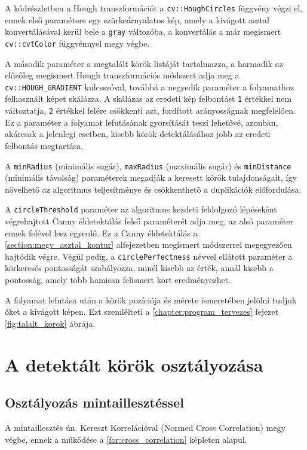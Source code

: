 \par A kódrészletben a Hough transzformációt a \lstinline{cv::HoughCircles} függvény\cite{opencv_docs} végzi el, ennek első paramétere egy szürkeárnyalatos kép, amely a kivágott asztal konvertálásával kerül bele a \lstinline{gray} változóba, a konvertálás a már megismert \lstinline{cv::cvtColor} függvénnyel\cite{opencv_docs} megy végbe.
\par A második paraméter a megtalált körök listáját tartalmazza, a harmadik az előzőleg megismert Hough transzformációs módszert\cite{opencv_docs,hough_transform,YUEN199071} adja meg a \lstinline{cv::HOUGH_GRADIENT} kulcsszóval, továbbá a negyedik paraméter a folyamathoz felhasznált képet skálázza. A skálázas az eredeti kép felbontást \lstinline{1} értékkel nem változtatja, \lstinline{2} értékkel felére csökkenti azt, fordított arányosságnak megfelelően\cite{opencv_docs}. Ez a paraméter a folyamat lefutásának gyorsítását teszi lehetővé, azonban, akárcsak a jelenlegi esetben, kisebb körök detektálásához jobb az eredeti felbontás megtartása.
\par A \lstinline{minRadius} (minimális sugár), \lstinline{maxRadius} (maximális sugár) és \lstinline{minDistance} (minimális távolság) paraméterek megadják a keresett körök tulajdonságait, így növelhető az algoritmus teljesítménye és csökkenthető a duplikációk előfordulása.
\par A \lstinline{circleThreshold} paraméter az algoritmus kezdeti feldolgozó lépéseként végrehajtott Canny éldetektálás felső paraméterét adja meg, az alsó paraméter ennek felével lesz egyenlő. Ez a Canny éldetektálás a \ref{section:megv_asztal_kontur} alfejezetben megismert módszerrel megegyezően hajtódik végre. Végül pedig, a \lstinline{circlePerfectness} névvel ellátott paraméter a körkeresés pontosságát szabályozza, minél kisebb az érték, annál kisebb a pontosság, amely több hamisan felismert kört eredményezhet.
\par A folyamat lefutása után a körök pozíciója és mérete ismeretében jelölni tudjuk őket a kivágott képen. Ezt szemlélteti a \ref{chapter:program_tervezes} fejezet \ref{fig:talalt_korok} ábrája.

\section{A detektált körök osztályozása}

\subsection{Osztályozás mintaillesztéssel}
\label{subsection:mintaillesztes_osztalyozas}
A mintaillesztés ún. Kereszt Korrelációval (Normed Cross Correlation) megy végbe, ennek a működése a \ref{for:cross_correlation} képleten alapul\cite{kaehler2016learning, opencv_docs}.

